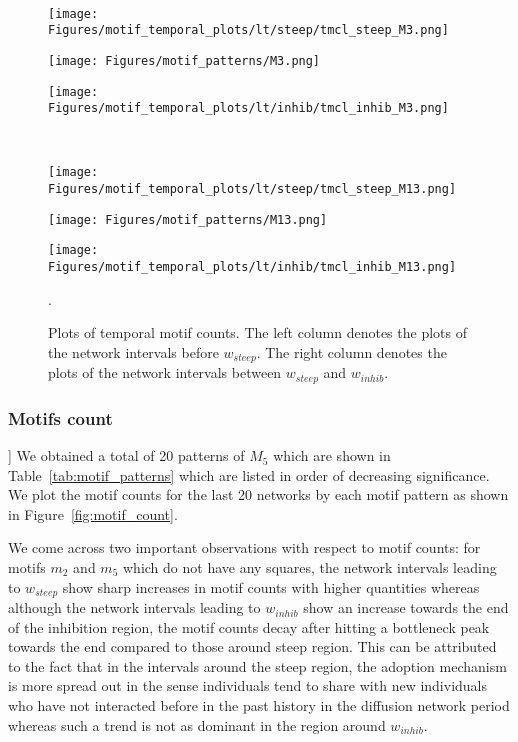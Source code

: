 \documentclass[smallextended]{svjour3}       %
\theoremstyle{definition}
\begin{document}
\begin{figure}[]
	\hfill
	\\
	\hfill
	\begin{minipage}{0.30\textwidth}%
		\texttt{[image: Figures/motif\_temporal\_plots/lt/steep/tmcl\_steep\_M3.png]}
	\end{minipage}
	\hfill
	\begin{minipage}{0\textwidth}%
		\texttt{[image: Figures/motif\_patterns/M3.png]}	
	\end{minipage}
	\hfill
	\begin{minipage}{0.35\textwidth}
		\texttt{[image: Figures/motif\_temporal\_plots/lt/inhib/tmcl\_inhib\_M3.png]}
	\end{minipage}
	\hfill
	\\
	\hfill
	\begin{minipage}{0.30\textwidth}%
		\texttt{[image: Figures/motif\_temporal\_plots/lt/steep/tmcl\_steep\_M13.png]}
	\end{minipage}
	\hfill
	\begin{minipage}{0\textwidth}%
		\texttt{[image: Figures/motif\_patterns/M13.png]}	
	\end{minipage}
	\hfill
	\begin{minipage}{0.35\textwidth}
		\texttt{[image: Figures/motif\_temporal\_plots/lt/inhib/tmcl\_inhib\_M13.png]}
	\end{minipage}
	\hfill
	\caption{Plots of temporal motif counts. The left column denotes the plots of the network intervals before $w_{steep}$. The right column denotes the plots of the network intervals between $w_{steep}$ and $w_{inhib}$. }. 
	\label{fig:motif_frontier}
\end{figure}

\subsubsection{Motifs count}]\label{sec:motif_count}
We obtained a total of 20 patterns of $M_5$ which are shown in Table~\ref{tab:motif_patterns} which are listed in order of decreasing significance.
We plot the motif counts for the last 20 networks by each motif pattern as shown in Figure~\ref{fig:motif_count}. 

We come across two important observations with respect to motif counts: for motifs $m_2 $ and $m_5$ which do not have any squares, the network intervals leading to $w_{steep}$ show sharp increases in motif counts with higher quantities whereas although the network intervals leading to $w_{inhib}$ show an increase towards the end of the inhibition region, the motif counts decay after hitting a bottleneck peak towards the end compared to those around steep region. This can be attributed to the fact that in the intervals around the steep region, the adoption mechanism is more spread out in the sense individuals tend to share with new individuals who have not interacted before in the past history in the diffusion network period whereas such a trend is not as dominant in the region around $w_{inhib}$.
\end{document}
